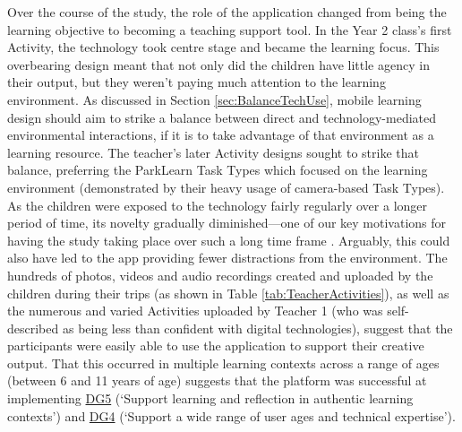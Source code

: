 Over the course of the study, the role of the application changed from being the learning objective to becoming a teaching support tool. In the Year 2 class’s first Activity, the technology took centre stage and became the learning focus. This overbearing design meant that not only did the children have little agency in their output, but they weren't paying much attention to the learning environment. As discussed in Section \ref{sec:BalanceTechUse}, mobile learning design should aim to strike a balance between direct and technology-mediated environmental interactions, if it is to take advantage of that environment as a learning resource. The teacher’s later Activity designs sought to strike that balance, preferring the ParkLearn Task Types which focused on the learning environment (demonstrated by their heavy usage of camera-based Task Types). As the children were exposed to the technology fairly regularly over a longer period of time, its novelty  gradually diminished---one of our key motivations for having the study taking place over such a long time frame \citep{Sharples2013}. Arguably, this could also have led to the app providing fewer distractions from the environment. The hundreds of photos, videos and audio recordings created and uploaded by the children during their trips (as shown in Table \ref{tab:TeacherActivities}), as well as the numerous and varied Activities uploaded by Teacher 1 (who was self-described as being less than confident with digital technologies), suggest that the participants were easily able to use the application to support their creative output. That this occurred in multiple learning contexts across a range of ages (between 6 and 11 years of age) suggests that the platform was successful at implementing \hyperref[DG5]{DG5} (`Support learning and reflection in authentic learning contexts') and \hyperref[DG4]{DG4} (`Support a wide range of user ages and technical expertise').

